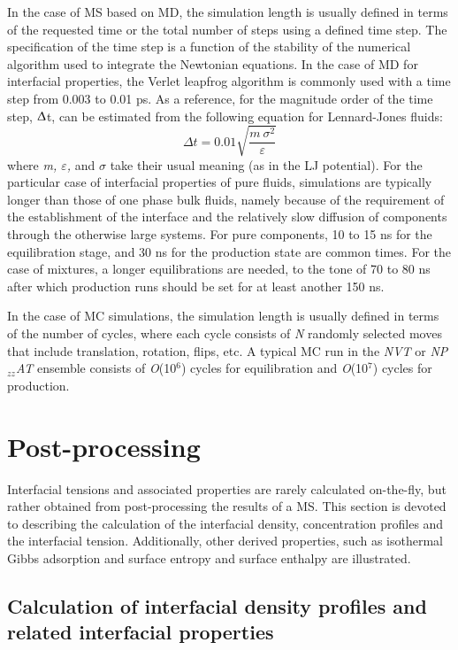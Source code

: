 \documentclass{scrbook}
\begin{document}
In the case of MS based on MD, the simulation length is usually defined in
terms of the requested time or the total number of steps using a defined time
step. The specification of the time step is a function of the stability of the
numerical algorithm used to integrate the Newtonian equations. In the case of
MD for interfacial properties, the Verlet leapfrog algorithm is commonly used
with a time step from 0.003 to 0.01 ps. As a reference, for the magnitude order
of the time step, ${\Updelta}$t, can be estimated from the following equation
for Lennard-Jones fluids:
\begin{equation}
\Delta t=0.01\sqrt{\frac{m\:\sigma^{2}}{\varepsilon}}
\end{equation}
where \textit{m, ${\varepsilon}$,} and ${\sigma}$  take their usual meaning (as
in the LJ potential). For the particular case of interfacial properties of pure
fluids, simulations are typically longer than those of one phase bulk fluids,
namely because of the requirement of the establishment of the interface and the
relatively slow diffusion of components through the otherwise large systems.
For pure components, 10 to 15 ns for the equilibration stage, and 30 ns for the
production state are common times. For the case of mixtures, a longer
equilibrations are needed, to the tone of 70 to 80 ns after which production
runs should be set for at least another 150 ns.

In the case of MC simulations, the simulation length is usually defined in
terms of the number of cycles, where each cycle consists of \textit{N} randomly
selected moves that include translation, rotation, flips, etc. A typical MC run
in the \textit{NVT} or \textit{NP}$_{zz}$\textit{AT} ensemble consists of
\textit{O}(10$^{6}$) cycles for equilibration and \textit{O}(10$^{7}$) cycles
for production.

\chapter{Post-processing}

Interfacial tensions and associated properties are rarely calculated
on-the-fly, but rather obtained from post-processing the results of a MS. This
section is devoted to describing the calculation of the interfacial density,
concentration profiles and the interfacial tension. Additionally, other derived
properties, such as isothermal Gibbs adsorption and surface entropy and surface
enthalpy are illustrated. 

\section{Calculation of interfacial density profiles and related interfacial properties}
\end{document}
